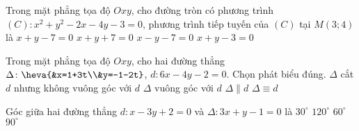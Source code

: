 	\begin{ex}%
		Trong mặt phẳng tọa độ $Oxy$, cho đường tròn có phương trình $(C)\colon x^2+y^2-2x-4y-3=0$, phương trình tiếp tuyến của $(C)$ tại $M(3;4)$ là
		\choice
		{\True $x+y-7=0$}
		{$x+y+7=0$}
		{$x-y-7=0$}
		{$x+y-3=0$}
	\end{ex}
	\begin{ex}%
		Trong mặt phẳng tọa độ $Oxy$, cho hai đường thẳng $\Delta\colon \heva{&x=1+3t\\&y=-1-2t}$, $d\colon 6x-4y-2=0$. Chọn phát biểu đúng.
		\choice
		{$\Delta$ cắt $d$ nhưng không vuông góc với $d$}
		{\True $\Delta$ vuông góc với $d$}
		{$\Delta\parallel d$}
		{$\Delta\equiv d$}
	
	\end{ex}
\begin{ex}%
	Góc giữa hai đường thẳng $d\colon x-3y+2=0$ và $\Delta \colon 3x+y-1=0$ là
	\choice
	{$30^\circ$}
	{$120^\circ$}
	{$60^\circ$}
	{\True $90^\circ$}
\end{ex}



